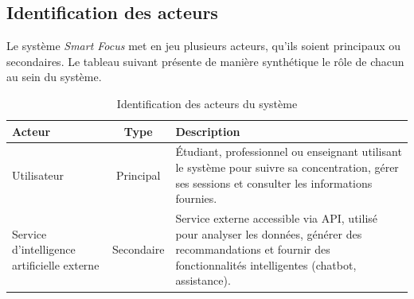 \subsection{Identification des acteurs}
Le système \textit{Smart Focus} met en jeu plusieurs acteurs, qu’ils soient principaux ou secondaires. Le tableau suivant présente de manière synthétique le rôle de chacun au sein du système.


\begin{table}[H]
\centering
\renewcommand{\arraystretch}{1.5}
\setlength{\tabcolsep}{8pt}

\begin{tabularx}{\textwidth}{|>{\raggedright\arraybackslash}p{4cm}|c|>{\raggedright\arraybackslash}X|}
\hline
\textbf{Acteur} & \textbf{Type} & \textbf{Description} \\
\hline

Utilisateur 
& Principal 
& Étudiant, professionnel ou enseignant utilisant le système pour suivre sa concentration, gérer ses sessions et consulter les informations fournies. \\
\hline

Service d’intelligence artificielle externe 
& Secondaire 
& Service externe accessible via API, utilisé pour analyser les données, générer des recommandations et fournir des fonctionnalités intelligentes (chatbot, assistance). \\
\hline

\end{tabularx}

\caption{Identification des acteurs du système}
\label{tab:acteurs}

\end{table}


